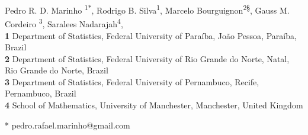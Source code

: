 \documentclass[10pt,letterpaper]{article}
\begin{document}
\vspace*{0.2in}

\begin{flushleft}
{\Large
\textbf{} %
}
\newline \vspace{0.3cm}
Pedro R. D. Marinho \textsuperscript{1${*}$},
Rodrigo B. Silva\textsuperscript{1\dag},
Marcelo Bourguignon\textsuperscript{2\S},
Gauss M. Cordeiro \textsuperscript{3\ddag},
Saralees Nadarajah\textsuperscript{4\kreuz},
\\
\bigskip
\textbf{1} Department of Statistics, Federal University of Para\'{i}ba, João Pessoa, Paraíba, Brazil
\\
\textbf{2} Department of Statistics, Federal University of Rio Grande do Norte, Natal, Rio Grande do Norte, Brazil
\\
\textbf{3} Department of Statistics, Federal University of Pernambuco, Recife, Pernambuco, Brazil
\\
\textbf{4} School of Mathematics, University of Manchester, Manchester, United Kingdom
\bigskip

%




* pedro.rafael.marinho@gmail.com

\end{flushleft}
\end{document}

